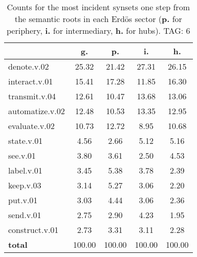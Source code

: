 \begin{table}[h!]
\begin{center}
\begin{tabular}{| l || c | c | c | c |}\hline
 & {\bf g.} & {\bf p.} & {\bf i.} & {\bf h.} \\\hline\hline
denote.v.02 & 25.32  & 21.42  & 27.31  & 26.15 \\\hline
interact.v.01 & 15.41  & 17.28  & 11.85  & 16.30 \\\hline
transmit.v.04 & 12.61  & 10.47  & 13.68  & 13.06 \\\hline
automatize.v.02 & 12.48  & 10.53  & 13.35  & 12.95 \\\hline
evaluate.v.02 & 10.73  & 12.72  & 8.95  & 10.68 \\\hline
state.v.01 & 4.56  & 2.66  & 5.12  & 5.16 \\\hline
see.v.01 & 3.80  & 3.61  & 2.50  & 4.53 \\\hline
label.v.01 & 3.45  & 5.38  & 3.78  & 2.39 \\\hline
keep.v.03 & 3.14  & 5.27  & 3.06  & 2.20 \\\hline
put.v.01 & 3.03  & 4.44  & 3.06  & 2.36 \\\hline
send.v.01 & 2.75  & 2.90  & 4.23  & 1.95 \\\hline
construct.v.01 & 2.73  & 3.31  & 3.11  & 2.28 \\\hline\hline
{{\bf total}} & 100.00  & 100.00  & 100.00  & 100.00 \\\hline
\end{tabular}
\caption{Counts for the most incident synsets one step from the semantic roots in each Erd\"os sector ({\bf p.} for periphery, {\bf i.} for intermediary, {\bf h.} for hubs). TAG: 6}
\end{center}
\end{table}